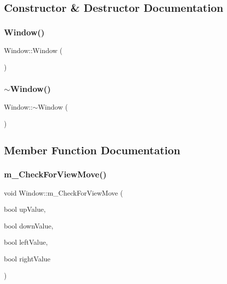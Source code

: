 \subsection{Constructor \& Destructor Documentation}
\mbox{\label{class_window_a74e6087da23d3c24e9fac0245e5ec92c}} 
\subsubsection{\texorpdfstring{Window()}{Window()}}
{\footnotesize\ttfamily Window\+::\+Window (\begin{DoxyParamCaption}{ }\end{DoxyParamCaption})}

\mbox{\label{class_window_a245d821e6016fa1f6970ccbbedd635f6}} 
\subsubsection{\texorpdfstring{$\sim$\+Window()}{~Window()}}
{\footnotesize\ttfamily Window\+::$\sim$\+Window (\begin{DoxyParamCaption}{ }\end{DoxyParamCaption})}



\subsection{Member Function Documentation}
\mbox{\label{class_window_a135fde3c6c15ff583e91ec17cb2d3766}} 
\subsubsection{\texorpdfstring{m\+\_\+\+Check\+For\+View\+Move()}{m\_CheckForViewMove()}}
{\footnotesize\ttfamily void Window\+::m\+\_\+\+Check\+For\+View\+Move (\begin{DoxyParamCaption}\item[{bool}]{up\+Value,  }\item[{bool}]{down\+Value,  }\item[{bool}]{left\+Value,  }\item[{bool}]{right\+Value }\end{DoxyParamCaption})}

